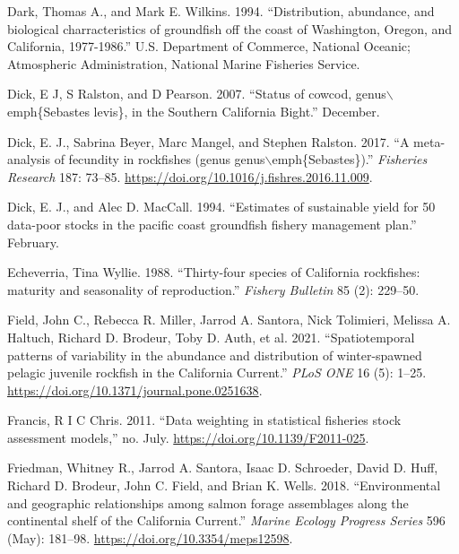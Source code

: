 \documentclass[
  english,
  a4paper,
]{article}
\newlength{\cslhangindent}
\newlength{\cslentryspacingunit} %
\newenvironment{CSLReferences}[2] %
 {%
  \setlength{\parindent}{0pt}
  \ifodd #1
  \let\oldpar\par
  \def\par{\hangindent=\cslhangindent\oldpar}
  \fi
  \setlength{\parskip}{#2\cslentryspacingunit}
 }%
 {}
\begin{document}
\begin{CSLReferences}{1}{0}
\leavevmode{}%
Dark, Thomas A., and Mark E. Wilkins. 1994. {``{Distribution, abundance, and biological charracteristics of groundfish off the coast of Washington, Oregon, and California, 1977-1986}.''} U.S. Department of Commerce, National Oceanic; Atmospheric Administration, National Marine Fisheries Service.

\leavevmode{}%
Dick, E J, S Ralston, and D Pearson. 2007. {``{Status of cowcod, genus\(\backslash\)emph{\{}Sebastes levis{\}}, in the Southern California Bight}.''} December.

\leavevmode{}%
Dick, E. J., Sabrina Beyer, Marc Mangel, and Stephen Ralston. 2017. {``{A meta-analysis of fecundity in rockfishes (genus genus\(\backslash\)emph{\{}Sebastes{\}})}.''} \emph{Fisheries Research} 187: 73--85. \url{https://doi.org/10.1016/j.fishres.2016.11.009}.

\leavevmode{}%
Dick, E. J., and Alec D. MacCall. 1994. {``{Estimates of sustainable yield for 50 data-poor stocks in the pacific coast groundfish fishery management plan}.''} February.

\leavevmode{}%
Echeverria, Tina Wyllie. 1988. {``{Thirty-four species of California rockfishes: maturity and seasonality of reproduction}.''} \emph{Fishery Bulletin} 85 (2): 229--50.

\leavevmode{}%
Field, John C., Rebecca R. Miller, Jarrod A. Santora, Nick Tolimieri, Melissa A. Haltuch, Richard D. Brodeur, Toby D. Auth, et al. 2021. {``{Spatiotemporal patterns of variability in the abundance and distribution of winter-spawned pelagic juvenile rockfish in the California Current}.''} \emph{PLoS ONE} 16 (5): 1--25. \url{https://doi.org/10.1371/journal.pone.0251638}.

\leavevmode{}%
Francis, R I C Chris. 2011. {``{Data weighting in statistical fisheries stock assessment models},''} no. July. \url{https://doi.org/10.1139/F2011-025}.

\leavevmode{}%
Friedman, Whitney R., Jarrod A. Santora, Isaac D. Schroeder, David D. Huff, Richard D. Brodeur, John C. Field, and Brian K. Wells. 2018. {``{Environmental and geographic relationships among salmon forage assemblages along the continental shelf of the California Current}.''} \emph{Marine Ecology Progress Series} 596 (May): 181--98. \url{https://doi.org/10.3354/meps12598}.


\end{CSLReferences}
\end{document}
